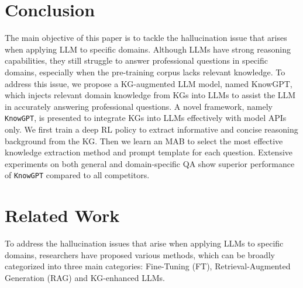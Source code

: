 \documentclass{article}
\theoremstyle{boldremark}
\begin{document}
\section{Conclusion}
The main objective of this paper is to tackle the hallucination issue that arises when applying LLM to specific domains. 
Although LLMs have strong reasoning capabilities, they still struggle to answer professional questions in specific domains, especially when the pre-training corpus lacks relevant knowledge. To address this issue, we propose a KG-augmented LLM model, named KnowGPT, which injects relevant domain knowledge from KGs into LLMs to assist the LLM in accurately answering professional questions.  A novel framework, namely \texttt{KnowGPT}, is presented to integrate KGs into LLMs effectively with model APIs only. We first train a deep RL policy to extract informative and concise reasoning background from the KG. Then we learn an MAB to select the most effective knowledge extraction method and prompt template for each question.
Extensive experiments on both general and domain-specific QA show superior performance of \texttt{KnowGPT} compared to all competitors. 

\newpage
\appendix

\section{Related Work}
To address the hallucination issues that arise when applying LLMs to specific domains, researchers have proposed various methods, which can be broadly categorized into three main categories: Fine-Tuning (FT),  Retrieval-Augmented Generation (RAG) and KG-enhanced LLMs.
\end{document}
